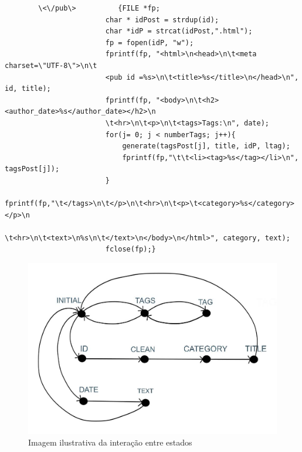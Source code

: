 \documentclass[25pt]{article}
\begin{document}
    \begin{verbatim}
        \<\/pub\>	       {FILE *fp;
                        char * idPost = strdup(id);
                        char *idP = strcat(idPost,".html");
                        fp = fopen(idP, "w");
                        fprintf(fp, "<html>\n<head>\n\t<meta charset=\"UTF-8\">\n\t
                        <pub id =%s>\n\t<title>%s</title>\n</head>\n", id, title);
                        fprintf(fp, "<body>\n\t<h2><author_date>%s</author_date></h2>\n
                        \t<hr>\n\t<p>\n\t<tags>Tags:\n", date);
                        for(j= 0; j < numberTags; j++){
                            generate(tagsPost[j], title, idP, ltag);
                            fprintf(fp,"\t\t<li><tag>%s</tag></li>\n", tagsPost[j]);
                        }
                        fprintf(fp,"\t</tags>\n\t</p>\n\t<hr>\n\t<p>\t<category>%s</category></p>\n
                        \t<hr>\n\t<text>\n%s\n\t</text>\n</body>\n</html>", category, text);
                        fclose(fp);}
    \end{verbatim}
    \begin{figure}
    \centering\includegraphics[scale=0.30]{estados}
    \caption{\label{fig:controller}Imagem ilustrativa da interação entre estados}
    \end{figure}
    \newpage
    \newpage
\end{document}
